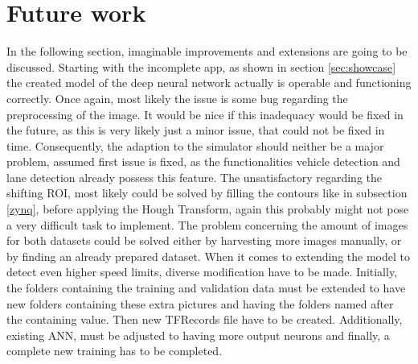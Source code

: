 
\chapter{Future work}\label{chapter:futurework}
In the following section, imaginable improvements and extensions are going to be discussed.\newline 
Starting with the incomplete app, as shown in section \ref{sec:showcase} the created model of the deep neural network actually is operable and functioning correctly. Once again, most likely the issue is some bug regarding the preprocessing of the image. It would be nice if this inadequacy would be fixed in the future, as this is very likely just a minor issue, that could not be fixed in time. \newline
Consequently, the adaption to the simulator should neither be a major problem, assumed first issue is fixed, as the functionalities vehicle detection and lane detection already possess this feature. \newline
The unsatisfactory regarding the shifting ROI, most likely could be solved by filling the contours like in subsection \ref{zynq}, before applying the Hough Transform, again this probably might not pose a very difficult task to implement. \newline
The problem concerning the amount of images for both datasets could be solved either by harvesting more images manually, or by finding an already prepared dataset. When it comes to extending the model to detect even higher speed limits, diverse modification have to be made. Initially, the folders containing the training and validation data must be extended to have new folders containing these extra pictures and having the folders named after the containing value. Then new TFRecords file have to be created. Additionally,  existing ANN, must be adjusted to having more output neurons and finally, a complete new training has to be completed.\newline


